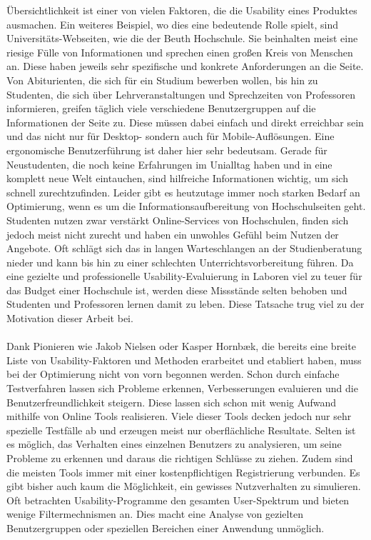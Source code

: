 Übersichtlichkeit ist einer von vielen Faktoren, die die Usability eines Produktes ausmachen. Ein weiteres Beispiel, wo dies eine bedeutende Rolle spielt, sind Universitäts-Webseiten, wie die der Beuth Hochschule. Sie beinhalten meist eine riesige Fülle von Informationen und sprechen einen großen Kreis von Menschen an. Diese haben jeweils sehr spezifische und konkrete Anforderungen an die Seite. Von Abiturienten, die sich für ein Studium bewerben wollen, bis hin zu Studenten, die sich über Lehrveranstaltungen und Sprechzeiten von Professoren informieren, greifen täglich viele verschiedene Benutzergruppen auf die Informationen der Seite zu. Diese müssen dabei einfach und direkt erreichbar sein und das nicht nur für Desktop- sondern auch für Mobile-Auflösungen. Eine ergonomische Benutzerführung ist daher hier sehr bedeutsam. Gerade für Neustudenten, die noch keine Erfahrungen im Unialltag haben und in eine komplett neue Welt eintauchen, sind hilfreiche Informationen wichtig, um sich schnell zurechtzufinden. Leider gibt es heutzutage immer noch starken Bedarf an Optimierung, wenn es um die Informationsaufbereitung von Hochschulseiten geht. Studenten nutzen zwar verstärkt Online-Services von Hochschulen, finden sich jedoch meist nicht zurecht und haben ein unwohles Gefühl beim Nutzen der Angebote. Oft schlägt sich das in langen Warteschlangen an der Studienberatung nieder und kann bis hin zu einer schlechten Unterrichtsvorbereitung führen. Da eine gezielte und professionelle Usability-Evaluierung in Laboren viel zu teuer für das Budget einer Hochschule ist, werden diese Missstände selten behoben und Studenten und Professoren lernen damit zu leben. Diese Tatsache trug viel zu der Motivation dieser Arbeit bei.\\
\\
Dank Pionieren wie Jakob Nielsen oder Kasper Hornbæk, die bereits eine breite Liste von Usability-Faktoren und Methoden erarbeitet und etabliert haben, muss bei der Optimierung nicht von vorn begonnen werden. Schon durch einfache Testverfahren lassen sich Probleme erkennen, Verbesserungen evaluieren und die Benutzerfreundlichkeit steigern. Diese lassen sich schon mit wenig Aufwand mithilfe von Online Tools realisieren. Viele dieser Tools decken jedoch nur sehr spezielle Testfälle ab und erzeugen meist nur oberflächliche Resultate. Selten ist es möglich, das Verhalten eines einzelnen Benutzers zu analysieren, um seine Probleme zu erkennen und daraus die richtigen Schlüsse zu ziehen. Zudem sind die meisten Tools immer mit einer kostenpflichtigen Registrierung verbunden. Es gibt bisher auch kaum die Möglichkeit, ein gewisses Nutzverhalten zu simulieren. Oft betrachten Usability-Programme den gesamten User-Spektrum und bieten wenige Filtermechnismen an. Dies macht eine Analyse von gezielten Benutzergruppen oder speziellen Bereichen einer Anwendung unmöglich.\\
